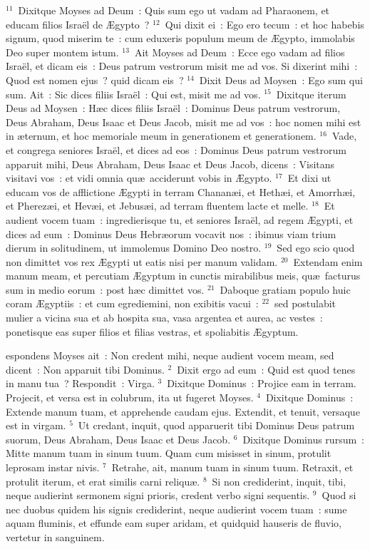 ${}^{11}$~Dixitque Moyses ad Deum~: Quis sum ego ut vadam ad Pharaonem, et educam filios Isra\"el de \AE gypto~?
${}^{12}$~Qui dixit ei~: Ego ero tecum~: et hoc habebis signum, quod miserim te~: cum eduxeris populum meum de \AE gypto, immolabis Deo super montem istum.
${}^{13}$~Ait Moyses ad Deum~: Ecce ego vadam ad filios Isra\"el, et dicam eis~: Deus patrum vestrorum misit me ad vos. Si dixerint mihi~: Quod est nomen ejus~? quid dicam eis~?
${}^{14}$~Dixit Deus ad Moysen~: Ego sum qui sum. Ait~: Sic dices filiis Isra\"el~: Qui est, misit me ad vos.
${}^{15}$~Dixitque iterum Deus ad Moysen~: H\ae c dices filiis Isra\"el~: Dominus Deus patrum vestrorum, Deus Abraham, Deus Isaac et Deus Jacob, misit me ad vos~: hoc nomen mihi est in \ae ternum, et hoc memoriale meum in generationem et generationem.
${}^{16}$~Vade, et congrega seniores Isra\"el, et dices ad eos~: Dominus Deus patrum vestrorum apparuit mihi, Deus Abraham, Deus Isaac et Deus Jacob, dicens~: Visitans visitavi vos~: et vidi omnia qu\ae\ acciderunt vobis in \AE gypto.
${}^{17}$~Et dixi ut educam vos de afflictione \AE gypti in terram Chanan\ae i, et Heth\ae i, et Amorrh\ae i, et Pherez\ae i, et Hev\ae i, et Jebus\ae i, ad terram fluentem lacte et melle.
${}^{18}$~Et audient vocem tuam~: ingredierisque tu, et seniores Isra\"el, ad regem \AE gypti, et dices ad eum~: Dominus Deus Hebr\ae orum vocavit nos~: ibimus viam trium dierum in solitudinem, ut immolemus Domino Deo nostro.
${}^{19}$~Sed ego scio quod non dimittet vos rex \AE gypti ut eatis nisi per manum validam.
${}^{20}$~Extendam enim manum meam, et percutiam \AE gyptum in cunctis mirabilibus meis, qu\ae\ facturus sum in medio eorum~: post h\ae c dimittet vos.
${}^{21}$~Daboque gratiam populo huic coram \AE gyptiis~: et cum egrediemini, non exibitis vacui~:
${}^{22}$~sed postulabit mulier a vicina sua et ab hospita sua, vasa argentea et aurea, ac vestes~: ponetisque eas super filios et filias vestras, et spoliabitis \AE gyptum.

\bchapter
{}espondens Moyses ait~: Non credent mihi, neque audient vocem meam, sed dicent~: Non apparuit tibi Dominus.
${}^{2}$~Dixit ergo ad eum~: Quid est quod tenes in manu tua~? Respondit~: Virga.
${}^{3}$~Dixitque Dominus~: Projice eam in terram. Projecit, et versa est in colubrum, ita ut fugeret Moyses.
${}^{4}$~Dixitque Dominus~: Extende manum tuam, et apprehende caudam ejus. Extendit, et tenuit, versaque est in virgam.
${}^{5}$~Ut credant, inquit, quod apparuerit tibi Dominus Deus patrum suorum, Deus Abraham, Deus Isaac et Deus Jacob.
${}^{6}$~Dixitque Dominus rursum~: Mitte manum tuam in sinum tuum. Quam cum misisset in sinum, protulit leprosam instar nivis.
${}^{7}$~Retrahe, ait, manum tuam in sinum tuum. Retraxit, et protulit iterum, et erat similis carni reliqu\ae .
${}^{8}$~Si non crediderint, inquit, tibi, neque audierint sermonem signi prioris, credent verbo signi sequentis.
${}^{9}$~Quod si nec duobus quidem his signis crediderint, neque audierint vocem tuam~: sume aquam fluminis, et effunde eam super aridam, et quidquid hauseris de fluvio, vertetur in sanguinem.


